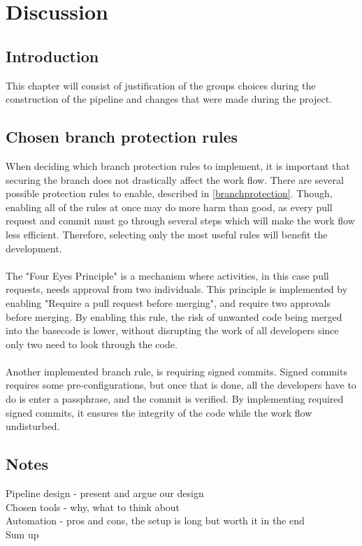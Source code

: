 \chapter{Discussion}
\section{Introduction}
This chapter will consist of justification of the groups choices during the construction of the pipeline and changes that were made during the project. 

\section{Chosen branch protection rules}
When deciding which branch protection rules to implement, it is important that securing the branch does not drastically affect the work flow. There are several possible protection rules to enable, described in \ref{branchprotection}. Though, enabling all of the rules at once may do more harm than good, as every pull request and commit must go through several steps which will make the work flow less efficient. Therefore, selecting only the most useful rules will benefit the development. 
\\~\\
The "Four Eyes Principle" is a mechanism where activities, in this case pull requests, needs approval from two individuals.  This principle is implemented by enabling "Require a pull request before merging", and require two approvals before merging. By enabling this rule, the risk of unwanted code being merged into the basecode is lower, without disrupting the work of all developers since only two need to look through the code. \cite{foureyes}
\\~\\
Another implemented branch rule, is requiring signed commits. Signed commits requires some pre-configurations, but once that is done, all the developers have to do is enter a passphrase, and the commit is verified. By implementing required signed commits, it ensures the integrity of the code while the work flow undisturbed.

\section{Notes}
Pipeline design - present and argue our design \\
Chosen tools - why, what to think about \\
Automation - pros and cons, the setup is long but worth it in the end \\
Sum up\\~\\

